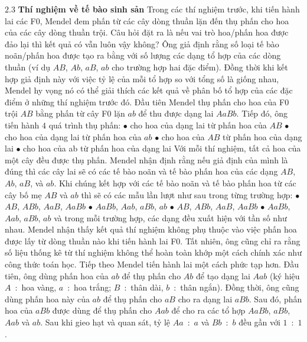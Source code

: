 \begin{multicols}{2}
	\vskip 0.1cm
	$\pmb{2.3}$ \textbf{\color{timhieukhoahoc}Thí nghiệm về tế bào sinh sản}
	\vskip 0.1cm
	Trong các thí nghiệm trước, khi tiến hành lai các F$0$, Mendel đem phấn từ các cây dòng thuần lặn đến thụ phấn cho hoa của các cây dòng thuần trội. Câu hỏi đặt ra là nếu vai trò hoa/phấn hoa được đảo lại thì kết quả có vẫn luôn vậy không? Ông giả định rằng số loại tế bào noãn/phấn hoa được tạo ra bằng với số lượng các dạng tổ hợp của các dòng thuần (ví dụ $AB$, $Ab$, $aB$, $ab$ cho trường hợp hai đặc điểm). Đồng thời khi kết hợp giả định này với việc tỷ lệ của mỗi tổ hợp so với tổng số là giống nhau, Mendel hy vọng nó có thể giải thích các kết quả về phân bố tổ hợp của các đặc điểm ở những thí nghiệm trước đó.
	\vskip 0.1cm
	Đầu tiên Mendel thụ phấn cho hoa của F$0$ trội $AB$ bằng phấn từ cây F$0$ lặn $ab$ để thu được dạng lai $AaBb$. Tiếp đó, ông tiến hành $4$ quá trình thụ phấn:
	\vskip 0.1cm
	$\bullet$ cho hoa của dạng lai từ phấn hoa của $AB$
	\vskip 0.1cm
	$\bullet$ cho hoa của dạng lai từ phấn hoa của $ab$
	\vskip 0.1cm
	$\bullet$ cho hoa của $AB$ từ phấn hoa của dạng lai
	\vskip 0.1cm
	$\bullet$ cho hoa của ab từ phấn hoa của dạng lai
	\vskip 0.1cm
	Với mỗi thí nghiệm, tất cả hoa của một cây đều được thụ phấn. Mendel nhận định rằng nếu giả định của mình là đúng thì các cây lai sẽ có các tế bào noãn và tế bào phấn hoa của các dạng $AB$, $Ab$, $aB$, và $ab$. Khi chúng kết hợp với các tế bào noãn và tế bào phấn hoa từ các cây bố mẹ $AB$ và $ab$ thì sẽ có các mẫu lần lượt như sau trong từng trường hợp:
	\vskip 0.1cm
	$\bullet$ $AB$, $ABb$, $AaB$, $AaBb$
	\vskip 0.1cm
	$\bullet$ $AaBb$, $Aab$, $aBb$, $ab$
	\vskip 0.1cm
	$\bullet$ $AB$, $ABb$, $AaB$, $AaBb$
	\vskip 0.1cm
	$\bullet$ $AaBb$, $Aab$, $aBb$, $ab$
	\vskip 0.1cm
	và trong mỗi trường hợp, các dạng đều xuất hiện với tần số như nhau.
	\vskip 0.1cm
	Mendel nhận thấy kết quả thí nghiệm không phụ thuộc vào việc phấn hoa được lấy từ dòng thuần nào khi tiến hành lai F$0$. Tất nhiên, ông cũng chỉ ra rằng số liệu thống kê từ thí nghiệm không thể hoàn toàn khớp một cách chính xác như công thức toán học.
	\vskip 0.1cm
	Tiếp theo Mendel tiến hành lai một cách phức tạp hơn. Đầu tiên, ông dùng phấn hoa của $ab$ để thụ phấn cho $Ab$ để tạo dạng lai $Aab$ (ký hiệu $A$~:~hoa vàng, $a$~:~hoa trắng; $B$~:~thân dài, $b$~:~thân ngắn). Đồng thời, ông cũng dùng phấn hoa này của $ab$ để thụ phấn cho $aB$ cho ra dạng lai $aBb$. Sau đó, phấn hoa của $aBb$ được dùng để thụ phấn cho $Aab$ để cho ra các tổ hợp $AaBb$, $aBb$, $Aab$ và $ab$. Sau khi gieo hạt và quan sát, tỷ lệ $Aa$~:~$a$ và $Bb$~:~$b$ đều gần với $1$~:~$1$.

\end{multicols}
